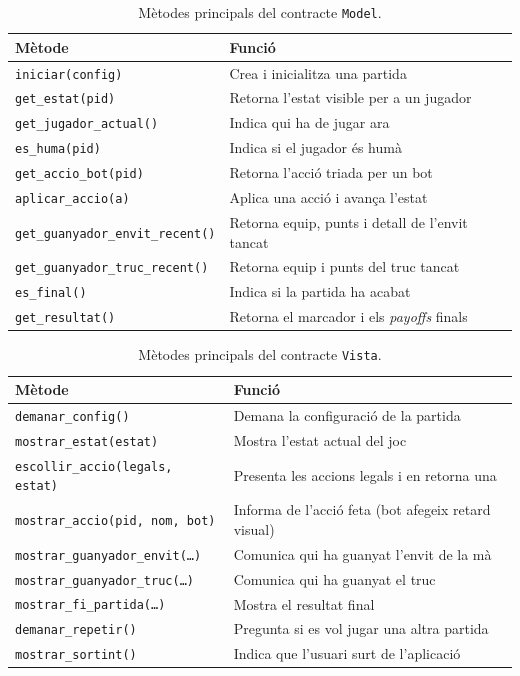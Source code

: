 \begin{table}[H]
  \centering
  \begin{tabular}{ll}
    \toprule
    Mètode & Funció \\
    \midrule
    \texttt{iniciar(config)}               & Crea i inicialitza una partida \\
    \texttt{get\_estat(pid)}               & Retorna l'estat visible per a un jugador \\
    \texttt{get\_jugador\_actual()}        & Indica qui ha de jugar ara \\
    \texttt{es\_huma(pid)}                 & Indica si el jugador és humà \\
    \texttt{get\_accio\_bot(pid)}          & Retorna l'acció triada per un bot \\
    \texttt{aplicar\_accio(a)}             & Aplica una acció i avança l'estat \\
    \texttt{get\_guanyador\_envit\_recent()} & Retorna equip, punts i detall de l'envit tancat \\
    \texttt{get\_guanyador\_truc\_recent()} & Retorna equip i punts del truc tancat \\
    \texttt{es\_final()}                   & Indica si la partida ha acabat \\
    \texttt{get\_resultat()}               & Retorna el marcador i els \emph{payoffs} finals \\
    \bottomrule
  \end{tabular}
  \caption{Mètodes principals del contracte \texttt{Model}.}
  \label{tab:contracte-model}
\end{table}

\begin{table}[H]
  \centering\small
  \begin{tabular}{ll}
    \toprule
    Mètode & Funció \\
    \midrule
    \texttt{demanar\_config()}              & Demana la configuració de la partida \\
    \texttt{mostrar\_estat(estat)}          & Mostra l'estat actual del joc \\
    \texttt{escollir\_accio(legals, estat)} & Presenta les accions legals i en retorna una \\
    \texttt{mostrar\_accio(pid, nom, bot)}  & Informa de l'acció feta (bot afegeix retard visual) \\
    \texttt{mostrar\_guanyador\_envit(\dots)} & Comunica qui ha guanyat l'envit de la mà \\
    \texttt{mostrar\_guanyador\_truc(\dots)}  & Comunica qui ha guanyat el truc \\
    \texttt{mostrar\_fi\_partida(\dots)}    & Mostra el resultat final \\
    \texttt{demanar\_repetir()}             & Pregunta si es vol jugar una altra partida \\
    \texttt{mostrar\_sortint()}             & Indica que l'usuari surt de l'aplicació \\
    \bottomrule
  \end{tabular}
  \caption{Mètodes principals del contracte \texttt{Vista}.}
  \label{tab:contracte-vista}
\end{table}

